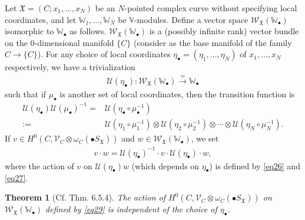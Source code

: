 \documentclass[12pt,a4paper,notitlepage]{article}
\theoremstyle{definition}
\theoremstyle{plain}
\newtheorem{thm}[df]{Theorem}
\newcommand{\fk}{\mathfrak}
\newcommand{\mc}{\mathcal}
\newcommand{\scr}{\mathscr}
\newcommand{\blt}{\bullet}
\newcommand{\Vbb}{\mathbb V}
\newcommand{\Wbb}{\mathbb W}
\numberwithin{equation}{section}
\begin{document}
Let $\fk X=(C;x_1,\dots,x_N)$ be an $N$-pointed complex curve without specifying local coordinates, and let $\Wbb_1,\dots,\Wbb_N$ be $\Vbb$-modules. Define a vector space $\scr W_{\fk X}(\Wbb_\blt)$ isomorphic to $\Wbb_\blt$ as follows. $\scr W_{\fk X}(\Wbb_\blt)$ is a (possibly infinite rank) vector bundle on the $0$-dimensional manifold $\{C\}$ (consider as the base manifold of the family $C\rightarrow \{C\}$). \index{WX@$\scr W_{\fk X}(\Wbb_\blt)$} For any choice of local coordinates $\eta_\blt=(\eta_1,\dots,\eta_N)$ of $x_1,\dots,x_N$ respectively, we have a trivialization \index{U@$\mc U(\eta_\blt)$}
\begin{align}
\mc U(\eta_\blt):\scr W_{\fk X}(\Wbb_\blt)\xrightarrow{\simeq} \Wbb_\blt  \label{eq34}
\end{align}
such that if $\mu_\blt$ is another set of local coordinates, then the transition function is
\begin{align}
\mc U(\eta_\blt)\mc U(\mu_\blt)^{-1}=&\mc U(\eta_\blt\circ\mu_\blt^{-1})\nonumber\\
:=&\mc U(\eta_1\circ\mu_1^{-1})\otimes \mc U(\eta_2\circ\mu_2^{-1})\otimes\cdots\otimes \mc U(\eta_N\circ\mu_N^{-1}).\label{eq32}
\end{align}
If $v\in H^0(C,\scr V_C\otimes\omega_C(\blt S_{\fk X}))$ and $w\in\scr W_{\fk X}(\Wbb_\blt)$, we set
\begin{align}
v\cdot w=\mc U(\eta_\blt)^{-1}\cdot v\cdot\mc U(\eta_\blt)\cdot w,\label{eq29}
\end{align}
where the action of $v$ on $\mc U(\eta_\blt)w$ (which depends on $\eta_\blt$) is defined by \eqref{eq26} and \eqref{eq27}.

\begin{thm}[Cf. \cite{FB04} Thm. 6.5.4]\label{lb13}
The action of $H^0(C,\scr V_C\otimes\omega_C(\blt S_{\fk X}))$ on $\scr W_{\fk X}(\Wbb_\blt)$  defined by \eqref{eq29} is independent of the choice of $\eta_\blt$.
\end{thm}
\end{document}
